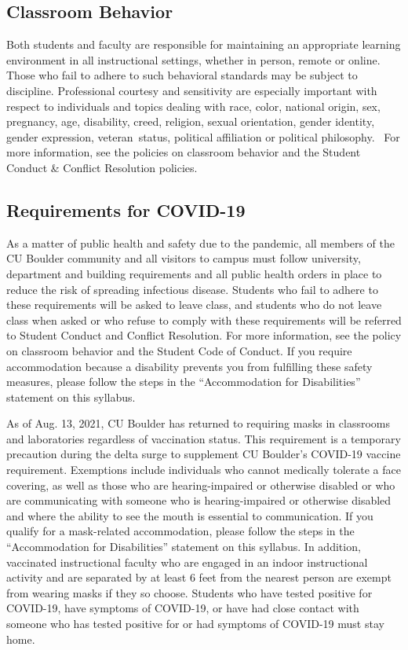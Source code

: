 \documentclass[9pt]{article}
\begin{document}
{\small

    \subsection*{Classroom Behavior}
Both students and faculty are responsible for maintaining an appropriate learning environment in all instructional settings, whether in person, remote or online. Those who fail to adhere to such behavioral standards may be subject to discipline. Professional courtesy and sensitivity are especially important with respect to individuals and topics dealing with race, color, national origin, sex, pregnancy, age, disability, creed, religion, sexual orientation, gender identity, gender expression, veteran status, political affiliation or political philosophy.  For more information, see the policies on classroom behavior and the Student Conduct \& Conflict Resolution policies. 

\subsection*{Requirements for COVID-19}

As a matter of public health and safety due to the pandemic, all members of the CU Boulder community and all visitors to campus must follow university, department and building requirements and all public health orders in place to reduce the risk of spreading infectious disease. Students who fail to adhere to these requirements will be asked to leave class, and students who do not leave class when asked or who refuse to comply with these requirements will be referred to Student Conduct and Conflict Resolution. For more information, see the policy on classroom behavior and the Student Code of Conduct. If you require accommodation because a disability prevents you from fulfilling these safety measures, please follow the steps in the “Accommodation for Disabilities” statement on this syllabus.

As of Aug. 13, 2021, CU Boulder has returned to requiring masks in classrooms and laboratories regardless of vaccination status. This requirement is a temporary precaution during the delta surge to supplement CU Boulder’s COVID-19 vaccine requirement. Exemptions include individuals who cannot medically tolerate a face covering, as well as those who are hearing-impaired or otherwise disabled or who are communicating with someone who is hearing-impaired or otherwise disabled and where the ability to see the mouth is essential to communication. If you qualify for a mask-related accommodation, please follow the steps in the “Accommodation for Disabilities” statement on this syllabus. In addition, vaccinated instructional faculty who are engaged in an indoor instructional activity and are separated by at least 6 feet from the nearest person are exempt from wearing masks if they so choose. 
Students who have tested positive for COVID-19, have symptoms of COVID-19, or have had close contact with someone who has tested positive for or had symptoms of COVID-19 must stay home. 

}
\end{document}
